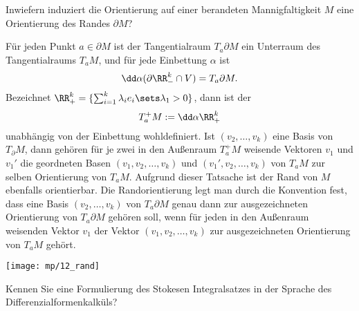\begin{frage}
  Inwiefern induziert die Orientierung auf einer 
  berandeten Mannigfaltigkeit $M$ eine Orientierung des Randes 
  $\partial M$?
\end{frage}

\begin{antwort}
  Für jeden Punkt $a\in \partial M$ ist der Tangentialraum 
  $T_a \partial M$ ein Unterraum des Tangentialraums $T_a M$, und 
  für jede Einbettung $\alpha$ ist 
  \[
  \dd \alpha ( \partial \RR^k_- \cap V ) = T_a \partial M. 
  \]
  Bezeichnet 
  $\RR^k_+ = \{ \sum_{i=1}^k \lambda_i e_i \sets \lambda_1 > 0 \}$, 
  dann ist der   
  \[
  T^+ _a M := \dd \alpha \RR^k_+ 
  \]
  unabhängig von der Einbettung wohldefiniert. 
  Ist $(v_2,\ldots, v_k)$ eine Basis von $T_ \partial M$, 
  dann gehören für je zwei in den Außenraum $T^+ _a M$ 
  weisende Vektoren $v_1$ und $v_1'$ die geordneten Basen 
  $( v_1, v_2, \ldots, v_k )$ und 
  $( v_1', v_2, \ldots, v_k )$ von $T_a M$ zur selben Orientierung 
  von $T_a M$. Aufgrund dieser Tatsache ist der Rand von $M$ 
  ebenfalls orientierbar. Die Randorientierung legt man durch die 
  Konvention fest, dass eine Basis $(v_2,\ldots, v_k)$ von 
  $T_a \partial M$ genau dann zur ausgezeichneten Orientierung von 
  $T_a\partial M$ gehören soll, wenn für jeden in 
  den Außenraum weisenden 
  Vektor $v_1$ der Vektor $(v_1,v_2,\ldots,v_k)$ zur ausgezeichneten 
  Orientierung von $T_a M$ gehört. \AntEnd

  \begin{center}
    \texttt{[image: mp/12\_rand]}
    \label{fig:12_rand}
  \end{center}
\end{antwort}

\begin{frage}
  Kennen Sie eine Formulierung des Stokes\sch en Integralsatzes in der 
  Sprache des Differenzialformenkalküls?
\end{frage}

